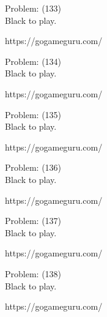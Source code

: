 \documentclass[11pt]{article}
\begin{document}
\begin{minipage}[t]{0.5\textwidth}
  {\centering
  
Problem: (133)\\
Black to play.

https://gogameguru.com/\\
  }
\end{minipage}
\begin{minipage}[t]{0.5\textwidth}
  {\centering
  
Problem: (134)\\
Black to play.

https://gogameguru.com/\\
  }
\end{minipage}
\begin{minipage}[t]{0.5\textwidth}
  {\centering
  
Problem: (135)\\
Black to play.

https://gogameguru.com/\\
  }
\end{minipage}
\begin{minipage}[t]{0.5\textwidth}
  {\centering
  
Problem: (136)\\
Black to play.

https://gogameguru.com/\\
  }
\end{minipage}
\begin{minipage}[t]{0.5\textwidth}
  {\centering
  
Problem: (137)\\
Black to play.

https://gogameguru.com/\\
  }
\end{minipage}
\begin{minipage}[t]{0.5\textwidth}
  {\centering
  
Problem: (138)\\
Black to play.

https://gogameguru.com/\\
  }
\end{minipage}
\end{document}
